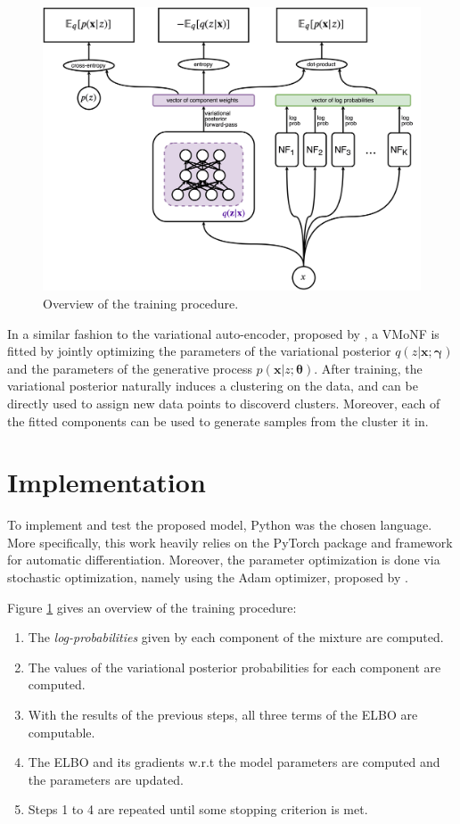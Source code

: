 \begin{figure}[!htb]
  \centering
  \includegraphics[width=0.85\linewidth]{figures/train_overview.png}
  \caption{Overview of the training procedure.}
  \label{fig:modeloverview}
\end{figure}

In a similar fashion to the variational auto-encoder, proposed by \textcite{vaepaper},
a VMoNF is fitted by jointly optimizing the parameters of the variational
posterior $q(z|\bm{x}; \bm\gamma)$ and the parameters of the generative process
$p(\bm{x}|z; \bm\theta)$.
After training, the variational posterior naturally induces a clustering on
the data, and can be directly used to assign new data points to discoverd clusters.
Moreover, each of the fitted components can be used to generate samples from the
cluster it  in.

\section{Implementation}

To implement and test the proposed model, Python was the chosen language. More
specifically, this work heavily relies on the PyTorch \autocite{pytorch} package
and framework for automatic differentiation. Moreover, the parameter optimization
is done via stochastic optimization, namely using the Adam optimizer, proposed by
\textcite{adam}.

Figure \ref{fig:modeloverview} gives an overview of the training procedure:
\begin{enumerate}
    \item The \emph{log-probabilities} given by each component of the mixture
    are computed.
    \item The values of the variational posterior probabilities for each
    component are computed.
    \item With the results of the previous steps, all three terms of the ELBO
    are computable.
    \item The ELBO and its gradients w.r.t the model parameters are computed
    and the parameters are updated.
    \item Steps 1 to 4 are repeated until some stopping criterion is met.
\end{enumerate}

